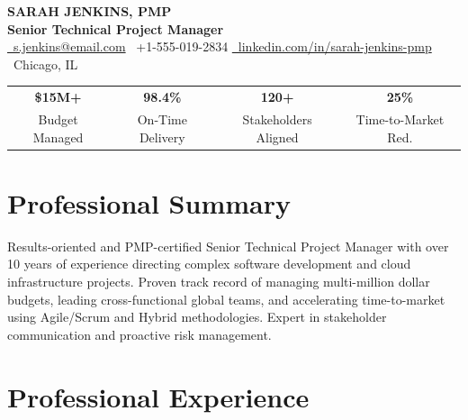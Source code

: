 \documentclass[10pt,letterpaper]{article}
\begin{document}
\pagestyle{empty}

\begin{center}
  {\Huge\textbf{\color{accent} SARAH JENKINS, PMP}} \\[5pt]
  {\large\textcolor{primary}{\textbf{Senior Technical Project Manager}}} \\[6pt]
  {\small 
    \href{mailto:s.jenkins@email.com}{\faEnvelope\ s.jenkins@email.com} \quad\textbullet\quad 
    \faPhone\ +1-555-019-2834 \quad\textbullet\quad 
    \href{https://linkedin.com/in/sarah-jenkins-pmp}{\faLinkedin\ linkedin.com/in/sarah-jenkins-pmp} \quad\textbullet\quad 
    \faMapMarker*\ Chicago, IL
  }
\end{center}

\vspace{4pt}

\begin{tcolorbox}[
    colback=accentlight,
    colframe=bordergrey,
    arc=4pt,
    boxrule=1pt,
    left=10pt, right=10pt, top=6pt, bottom=6pt
]
\begin{tabularx}{\linewidth}{C | C | C | C}
  \textbf{\color{primary}\Large \$15M+} & 
  \textbf{\color{primary}\Large 98.4\%} & 
  \textbf{\color{primary}\Large 120+} & 
  \textbf{\color{primary}\Large 25\%} \\
  \textcolor{textdark}{\footnotesize Budget Managed} & 
  \textcolor{textdark}{\footnotesize On-Time Delivery} & 
  \textcolor{textdark}{\footnotesize Stakeholders Aligned} & 
  \textcolor{textdark}{\footnotesize Time-to-Market Red.}
\end{tabularx}
\end{tcolorbox}

\vspace{-4pt}

\section*{Professional Summary}
Results-oriented and PMP-certified Senior Technical Project Manager with over 10 years of experience directing complex software development and cloud infrastructure projects. Proven track record of managing multi-million dollar budgets, leading cross-functional global teams, and accelerating time-to-market using Agile/Scrum and Hybrid methodologies. Expert in stakeholder communication and proactive risk management.

\section*{Professional Experience}
\end{document}
